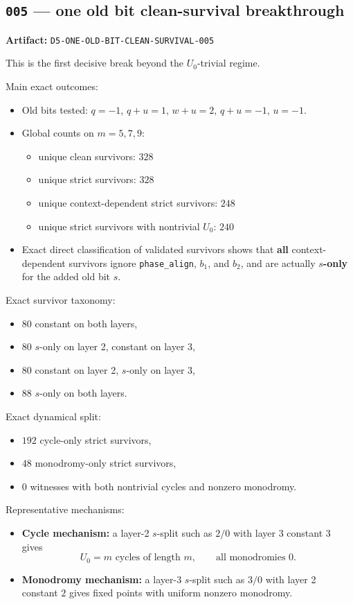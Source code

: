 \documentclass[11pt]{article}
\begin{document}
\subsection*{\texttt{005} --- one old bit clean-survival breakthrough}

\textbf{Artifact:} \texttt{D5-ONE-OLD-BIT-CLEAN-SURVIVAL-005}

This is the first decisive break beyond the $U_0$-trivial regime.

Main exact outcomes:
\begin{itemize}
    \item Old bits tested: $q=-1$, $q+u=1$, $w+u=2$, $q+u=-1$, $u=-1$.
    \item Global counts on $m=5,7,9$:
    \begin{itemize}
        \item unique clean survivors: $328$
        \item unique strict survivors: $328$
        \item unique context-dependent strict survivors: $248$
        \item unique strict survivors with nontrivial $U_0$: $240$
    \end{itemize}
    \item Exact direct classification of validated survivors shows that \textbf{all} context-dependent survivors ignore \texttt{phase\_align}, $b_1$, and $b_2$, and are actually \textbf{$s$-only} for the added old bit $s$.
\end{itemize}

Exact survivor taxonomy:
\begin{itemize}
    \item $80$ constant on both layers,
    \item $80$ $s$-only on layer 2, constant on layer 3,
    \item $80$ constant on layer 2, $s$-only on layer 3,
    \item $88$ $s$-only on both layers.
\end{itemize}

Exact dynamical split:
\begin{itemize}
    \item $192$ cycle-only strict survivors,
    \item $48$ monodromy-only strict survivors,
    \item $0$ witnesses with both nontrivial cycles and nonzero monodromy.
\end{itemize}

Representative mechanisms:
\begin{itemize}
    \item \textbf{Cycle mechanism:} a layer-2 $s$-split such as $2/0$ with layer 3 constant $3$ gives
    \[
    U_0 = m \text{ cycles of length } m,
    \qquad \text{all monodromies } 0.
    \]
    \item \textbf{Monodromy mechanism:} a layer-3 $s$-split such as $3/0$ with layer 2 constant $2$ gives fixed points with uniform nonzero monodromy.
\end{itemize}
\end{document}

